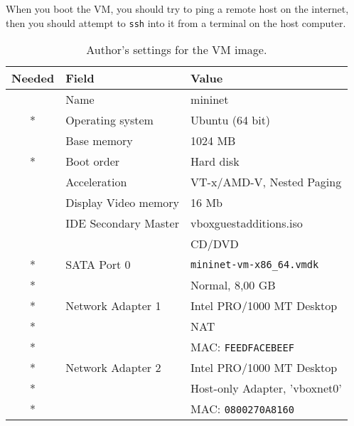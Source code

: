 When you boot the VM, you should try to ping a remote host on the internet,
then you should attempt to \texttt{ssh} into it from a terminal on the host
computer.

\begin{table}[ht]
  \centering
  \begin{tabular}{!{\vrule width -1pt}c
                  !{\vrule width -1pt}l
                  !{\vrule width -1pt}l}
  \hline
    \textbf{Needed}    & \textbf{Field}       & \textbf{Value} \\
    \hline
                       & Name                 & mininet \\
 * & Operating system     & Ubuntu (64 bit) \\
                       & Base memory          & 1024 MB \\
 * & Boot order           & Hard disk \\
                       & Acceleration         & VT-x/AMD-V, Nested Paging \\
                       & Display Video memory & 16 Mb \\
                       & IDE Secondary Master & vboxguestadditions.iso \\
                       &                      & CD/DVD \\
 * & SATA Port 0          & \texttt{mininet-vm-x86\_{}64.vmdk} \\
 * &                      & Normal, 8,00 GB \\
 * & Network Adapter 1    & Intel PRO/1000 MT Desktop \\
 * &                      & \acs{NAT} \\
 * &                      & MAC: \texttt{FEEDFACEBEEF} \\
 * & Network Adapter 2    & Intel PRO/1000 MT Desktop \\
 * &                      & Host-only Adapter, 'vboxnet0' \\
 * &                      & MAC: \texttt{0800270A8160} \\
    \hline
  \end{tabular}
  \caption{Author's settings for the VM image.}
  \label{table:vm.settings}
\end{table}

